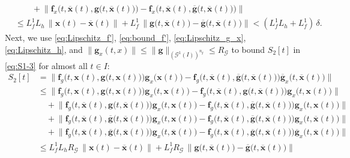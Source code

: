 \documentclass[onefignum,onetabnum]{siamart220329}
\numberwithin{equation}{section}
\newcommand{\bff}{\ensuremath{\mathbf{f}}} %
\newcommand{\bg}{\ensuremath{\mathbf{g}}} %
\newcommand{\bx}{\ensuremath{\mathbf{x}}} %
\newcommand {\cG} {\mathcal{G}}
\begin{document}
\begin{appendix}
\begin{align}
     	& \qquad  + \Big\| \bff_x \Big(t, \overline{\bx}(t), \bg \big(t, \overline{\bx}(t) \big) \Big) - \bff_x \Big(t, \overline{\bx}(t), \overline{\bg} \big(t, \overline{\bx}(t) \big) \Big) \Big\|  \nonumber \\
     	&\leq L_f^1  L_h \, \| \bx(t) - \overline{\bx}(t) \| + L_f^1 \, \big\| \bg\big(t, \overline{\bx}(t)\big) - \overline{\bg}\big(t, \overline{\bx}(t) \big) \big\| 
	< (L_f^1  L_h + L_f^1) \, \delta. 
     \end{align}
     Next, we use \cref{eq:Lipschitz_f'}, \cref{eq:bound_f'}, \cref{eq:Lipschitz_g_x}, \cref{eq:Lipschitz_h}, and 
     $\| \bg_x(t, x) \| \le  \| \bg \|_{(\cG^1(I))^{n_g}} \le R_\cG$ to 
      bound $S_2[t]$ in \cref{eq:S1-3} for almost all $t \in I$:
     \begin{equation}
     \begin{aligned}
     	S_2[t] &= \Big\| \bff_g \Big(t, \bx(t), \bg \big(t,  \bx(t) \big) \Big) \bg_x \big(\bx(t) \big) - \bff_g \Big(t, \overline{\bx}(t), \overline{\bg} \big(t,  \overline{\bx}(t) \big) \Big) \overline{\bg}_x \big(t,  \overline{\bx}(t) \big) \Big\| \\
     	&\leq \Big\| \bff_g \Big(t, \bx(t), \bg \big(t,  \bx(t) \big) \Big) \bg_x \big(t, \bx(t) \big) - \bff_g \Big(t, \overline{\bx}(t), \bg \big(t, \overline{\bx}(t) \big) \Big) \bg_x \big(t, \bx(t) \big) \Big\| \\
     	&\quad + \Big\| \bff_g \Big(t, \overline{\bx}(t), \bg \big(t,  \overline{\bx}(t) \big) \Big) \bg_x \big(t, \bx(t) \big) - \bff_g \Big(t, \overline{\bx}(t), \overline{\bg} \big(t,  \overline{\bx}(t) \big) \Big) \bg_x \big(t, \bx(t) \big) \Big\| \\
     	&\quad + \Big\| \bff_g \Big(t, \overline{\bx}(t), \overline{\bg} \big(t,  \overline{\bx}(t) \big) \Big) \bg_x \big(t,  \bx(t) \big) - \bff_g \Big(t, \overline{\bx}(t), \overline{\bg} \big(t,  \overline{\bx}(t) \big) \Big) \bg_x \big(t,  \overline{\bx}(t) \big) \Big\| \\
     	&\quad + \Big\| \bff_g \Big(t, \overline{\bx}(t), \overline{\bg} \big(t,  \overline{\bx}(t) \big) \Big) \bg_x \big(t,  \overline{\bx}(t) \big) - \bff_g \Big(t, \overline{\bx}(t), \overline{\bg} \big(t,  \overline{\bx}(t) \big) \Big) \overline{\bg}_x \big(t,  \overline{\bx}(t) \big) \Big\| \\
     	&\leq L_f^1  L_h  R_\cG \, \| \bx(t) - \overline{\bx}(t) \| 
	         + L_f^1  R_\cG \, \big\| \bg\big(t,  \overline{\bx}(t) \big) - \overline{\bg} \big( t, \overline{\bx}(t) \big) \big\| \\ 

\end{aligned}
\end{equation}
\end{appendix}
\end{document}
